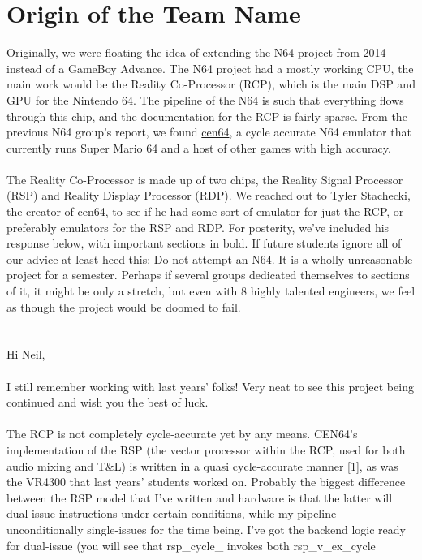 \documentclass[11pt,a4paper]{article}
\begin{document}
	\section{Origin of the Team Name}
	Originally, we were floating the idea of extending the N64 project from 2014 instead of a GameBoy Advance. The N64 project had a mostly working CPU, the main work would be the Reality Co-Processor (RCP), which is the main DSP and GPU for the Nintendo 64. The pipeline of the N64 is such that everything flows through this chip, and the documentation for the RCP is fairly sparse. From the previous N64 group's report, we found \href{https://github.com/tj90241/cen64}{cen64}, a cycle accurate N64 emulator that currently runs Super Mario 64 and a host of other games with high accuracy.\\\\
	The Reality Co-Processor is made up of two chips, the Reality Signal Processor (RSP) and Reality Display Processor (RDP). We reached out to Tyler Stachecki, the creator of cen64, to see if he had some sort of emulator for just the RCP, or preferably emulators for the RSP and RDP. For posterity, we've included his response below, with important sections in bold. If future students ignore all of our advice at least heed this: Do not attempt an N64. It is a wholly unreasonable project for a semester. Perhaps if several groups dedicated themselves to sections of it, it might be only a stretch, but even with 8 highly talented engineers, we feel as though the project would be doomed to fail.\\\\
	\\
	Hi Neil,\\\\
	I still remember working with last years' folks! Very neat to see this
	project being continued and wish you the best of luck.\\\\
	The RCP is not completely cycle-accurate yet by any means. CEN64's
	implementation of the RSP (the vector processor within the RCP, used
	for both audio mixing and T\&L) is written in a quasi cycle-accurate
	manner [1], as was the VR4300 that last years' students worked on.
	Probably the biggest difference between the RSP model that I've
	written and hardware is that the latter will dual-issue instructions
	under certain conditions, while my pipeline unconditionally
	single-issues for the time being. I've got the backend logic ready for
	dual-issue (you will see that rsp\_cycle\_ invokes both rsp\_v\_ex\_cycle
\end{document}
